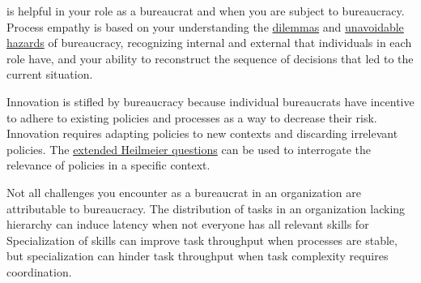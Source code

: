 

\iftoggle{glossarysubstitutionworks}{\Gls{process empathy}}{Process empathy} 
is helpful in your role as a bureaucrat and when you are subject to bureaucracy. 
Process empathy is based on your understanding the \hyperref[sec:dilemma-trilemma]{dilemmas} and \hyperref[sec:unavoidable-hazards]{unavoidable hazards} of bureaucracy, recognizing internal 
\iftoggle{glossarysubstitutionworks}{\glspl{motive}}{motives} and external 
\iftoggle{glossarysubstitutionworks}{\glspl{incentive}}{incentives}
 that individuals in each role have, and your ability to reconstruct the sequence of decisions that led to the current situation. 


Innovation is stifled by bureaucracy%
\iftoggle{haspagenumbers}{ (see page~\pageref{sec:innovation})}{} because individual bureaucrats have incentive to adhere to existing policies and processes as a way to decrease their risk. Innovation requires adapting policies to new contexts and discarding irrelevant policies. 
The \hyperref[sec:extending-Heilmeier]{extended Heilmeier questions}%
\iftoggle{haspagenumbers}{ (see page~\pageref{sec:extending-Heilmeier})}{} can be used to interrogate the relevance of policies in a specific context.


Not all challenges you encounter as a bureaucrat in an organization are attributable to bureaucracy. The distribution of tasks in an organization lacking hierarchy can induce latency when not everyone has all relevant skills for 
\iftoggle{haspagenumbers}{tasks -- see page \pageref{sec:work-distribution}.}{tasks.}
Specialization of skills can improve task throughput when processes are stable, but specialization can hinder task throughput when task complexity requires coordination.

